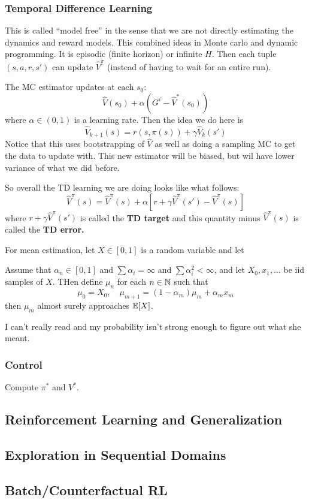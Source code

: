 \documentclass[12pt]{article}
\begin{document}
\subsubsection{Temporal Difference Learning}
This is called ``model free'' in the sense that we are not directly estimating the dynamics and reward models. This combined ideas in Monte carlo and dynamic programming.
It is episodic (finite horizon) or infinite $H$. Then each tuple $(s,a,r,s')$ can update $\hat V^\pi$ (instead of having to wait for an entire run).

The MC estimator updates at each $s_0$:
\[\hat V(s_0)+\alpha(G^i-\hat V^\ast(s_0))\]
where $\alpha\in(0,1)$ is a learning rate. Then the idea we do here is 
\[\hat V_{k+1}(s)=r(s,\pi(s))+\gamma\hat V_k(s')\]
Notice that this uses bootstrapping  of $\hat V$ as well as doing a sampling MC to get the data to update with.
This new estimator will be biased, but wil have lower variance of what we did before.

So overall the TD learning we are doing looks like what follows:
\[\hat V^\pi(s)=\hat V^\pi(s)+\alpha\left[r+\gamma\hat V^\pi(s')-\hat V^\pi(s)\right]\]
where $r+\gamma\hat V^\pi(s')$ is called the \textbf{TD target} and this quantity minus $\hat V^\pi(s)$ is called the \textbf{TD error.}

For mean estimation, let $X\in[0,1]$ is a random variable and let 
\begin{thm}
	Assume that $\alpha_n\in[0,1]$ and $\sum \alpha_i=\infty$ and $\sum \alpha_i^2<\infty$, and let $X_0,x_1,\dots$ be iid samples of $X$. THen define $\mu_n$ for each $n\in\mathbb{N}$ such that 
	\[\mu_0=X_0,\quad \mu_{m+1}=(1-\alpha_m)\mu_m+\alpha_mx_m\]
	then $\mu_m$ almost surely approaches $\mathbb{E}[X]$.
\end{thm}
\begin{rmk}
	I can't really read and my probability isn't strong enough to figure out what she meant.
\end{rmk}

\subsubsection{Control}
Compute $\pi^\ast$ and $V^\ast$.

\subsection{Reinforcement Learning and Generalization}

\subsection{Exploration in Sequential Domains}

\subsection{Batch/Counterfactual RL}
\end{document}
